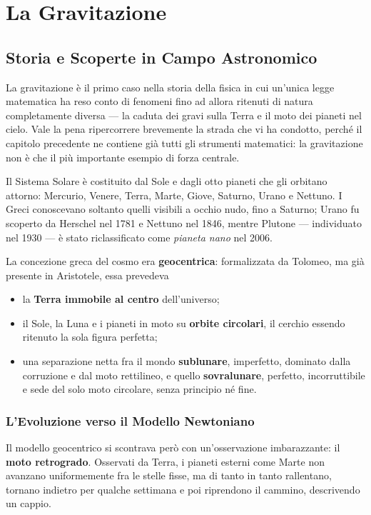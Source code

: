 \chapter{La Gravitazione}

\section{Storia e Scoperte in Campo Astronomico}

La gravitazione è il primo caso nella storia della fisica in cui un'unica legge matematica ha reso conto di fenomeni fino ad allora ritenuti di natura completamente diversa --- la caduta dei gravi sulla Terra e il moto dei pianeti nel cielo. Vale la pena ripercorrere brevemente la strada che vi ha condotto, perché il capitolo precedente ne contiene già tutti gli strumenti matematici: la gravitazione non è che il più importante esempio di forza centrale.

Il Sistema Solare è costituito dal Sole e dagli otto pianeti che gli orbitano attorno: Mercurio, Venere, Terra, Marte, Giove, Saturno, Urano e Nettuno. I Greci conoscevano soltanto quelli visibili a occhio nudo, fino a Saturno; Urano fu scoperto da Herschel nel 1781 e Nettuno nel 1846, mentre Plutone --- individuato nel 1930 --- è stato riclassificato come \emph{pianeta nano} nel 2006.

La concezione greca del cosmo era \textbf{geocentrica}: formalizzata da Tolomeo, ma già presente in Aristotele, essa prevedeva
\begin{itemize}
    \item la \textbf{Terra immobile al centro} dell'universo;
    \item il Sole, la Luna e i pianeti in moto su \textbf{orbite circolari}, il cerchio essendo ritenuto la sola figura perfetta;
    \item una separazione netta fra il mondo \textbf{sublunare}, imperfetto, dominato dalla corruzione e dal moto rettilineo, e quello \textbf{sovralunare}, perfetto, incorruttibile e sede del solo moto circolare, senza principio né fine.
\end{itemize}

\subsection{L'Evoluzione verso il Modello Newtoniano}

Il modello geocentrico si scontrava però con un'osservazione imbarazzante: il \textbf{moto retrogrado}. Osservati da Terra, i pianeti esterni come Marte non avanzano uniformemente fra le stelle fisse, ma di tanto in tanto rallentano, tornano indietro per qualche settimana e poi riprendono il cammino, descrivendo un cappio.

